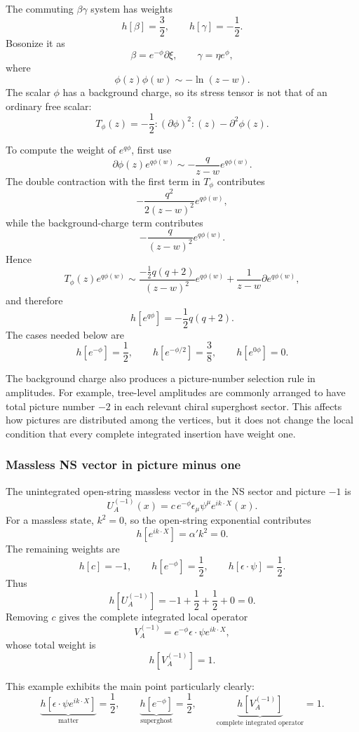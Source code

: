 \documentclass[
  10pt,
  a4paper,
  openany]{book}
\begin{document}
The commuting \(\beta\gamma\) system has weights \[
h[\beta]=\frac32,
\qquad
h[\gamma]=-\frac12.
\] Bosonize it as \[
\beta=e^{-\phi}\partial\xi,
\qquad
\gamma=\eta e^\phi,
\] where \[
\phi(z)\phi(w)\sim-\ln(z-w).
\] The scalar \(\phi\) has a background charge, so its stress tensor is
not that of an ordinary free scalar: \[
T_\phi(z)
=-\frac12:(\partial\phi)^2:(z)-\partial^2\phi(z).
\]

To compute the weight of \(e^{q\phi}\), first use \[
\partial\phi(z)e^{q\phi(w)}
\sim-\frac{q}{z-w}e^{q\phi(w)}.
\] The double contraction with the first term in \(T_\phi\) contributes
\[
-\frac{q^2}{2(z-w)^2}e^{q\phi(w)},
\] while the background-charge term contributes \[
-\frac{q}{(z-w)^2}e^{q\phi(w)}.
\] Hence \[
T_\phi(z)e^{q\phi(w)}
\sim
\frac{-\frac12q(q+2)}{(z-w)^2}e^{q\phi(w)}
+\frac{1}{z-w}\partial e^{q\phi(w)},
\] and therefore \[
\boxed{
h[e^{q\phi}]=-\frac12q(q+2)
}.
\] The cases needed below are \[
h[e^{-\phi}]=\frac12,
\qquad
h[e^{-\phi/2}]=\frac38,
\qquad
h[e^{0\phi}]=0.
\]

The background charge also produces a picture-number selection rule in
amplitudes. For example, tree-level amplitudes are commonly arranged to
have total picture number \(-2\) in each relevant chiral superghost
sector. This affects how pictures are distributed among the vertices,
but it does not change the local condition that every complete
integrated insertion have weight one.

\subsubsection{Massless NS vector in picture minus
one}\label{massless-ns-vector-in-picture-minus-one}

The unintegrated open-string massless vector in the NS sector and
picture \(-1\) is \[
U_A^{(-1)}(x)
=c\,e^{-\phi}\epsilon_\mu\psi^\mu e^{ik\cdot X}(x).
\] For a massless state, \(k^2=0\), so the open-string exponential
contributes \[
h[e^{ik\cdot X}]=\alpha'k^2=0.
\] The remaining weights are \[
h[c]=-1,
\qquad
h[e^{-\phi}]=\frac12,
\qquad
h[\epsilon\cdot\psi]=\frac12.
\] Thus \[
h[U_A^{(-1)}]
=-1+\frac12+\frac12+0=0.
\] Removing \(c\) gives the complete integrated local operator \[
V_A^{(-1)}
=e^{-\phi}\epsilon\cdot\psi e^{ik\cdot X},
\] whose total weight is \[
h[V_A^{(-1)}]=1.
\]

This example exhibits the main point particularly clearly: \[
\underbrace{h[\epsilon\cdot\psi e^{ik\cdot X}]}_{\text{matter}}=\frac12,
\qquad
\underbrace{h[e^{-\phi}]}_{\text{superghost}}=\frac12,
\qquad
\underbrace{h[V_A^{(-1)}]}_{\text{complete integrated operator}}=1.
\]
\end{document}
